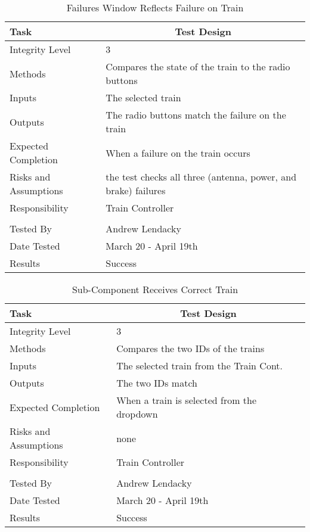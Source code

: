 \documentclass[]{article}
\begin{document}
\begin{table}[H]
	\centering
	\caption{Failures Window Reflects Failure on Train}
	\begin{tabular}{|l|l|}
		\hline
		Task & \multicolumn{1}{c|}{Test Design} \\ \hline
		Integrity Level & 3 \\ \hline
		Methods & Compares the state of the train to the radio buttons\\ \hline
		Inputs & The selected train\\ \hline
		Outputs & The radio buttons match the failure on the train\\ \hline
		Expected Completion & When a failure on the train occurs\\ \hline
		Risks and Assumptions & the test checks all three (antenna, power, and brake) failures \\ \hline
		Responsibility & Train Controller\\ \hline
			\\ \hline
		Tested By   &  Andrew Lendacky\\	\hline
		Date Tested & \parbox[t]{10cm}{March 20 - April 19th}\\ \hline
		Results & Success\\ \hline
	\end{tabular}
\end{table}

\begin{table}[H]
	\centering
	\caption{Sub-Component Receives Correct Train}
	\begin{tabular}{|l|l|}
		\hline
		Task & \multicolumn{1}{c|}{Test Design} \\ \hline
		Integrity Level & 3 \\ \hline
		Methods & Compares the two IDs of the trains\\ \hline
		Inputs & The selected train from the Train Cont.\\ \hline
		Outputs & The two IDs match \\ \hline
		Expected Completion & When a train is selected from the dropdown\\ \hline
		Risks and Assumptions & none \\ \hline
		Responsibility & Train Controller\\ \hline
			\\ \hline
		Tested By   &  Andrew Lendacky\\	\hline
		Date Tested & \parbox[t]{10cm}{March 20 - April 19th}\\ \hline
		Results & Success\\ \hline
	\end{tabular}
\end{table}
\end{document}
